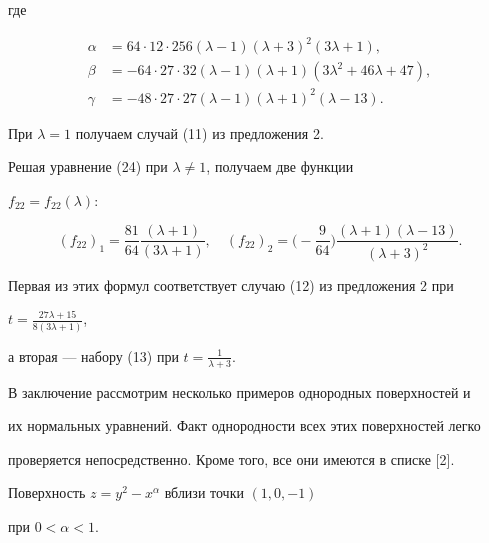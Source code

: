 где


\begin{align*}


\alpha&= 64 \cdot 12 \cdot 256 (\lambda - 1) (\lambda+3) ^2


(3 \lambda+1), \\


\beta&=-64 \cdot 27 \cdot 32 (\lambda - 1) (\lambda+1)


(3 \lambda^2+46 \lambda+47), \\


\gamma&=-48 \cdot 27 \cdot 27 (\lambda - 1) (\lambda+1)^2


(\lambda - 13).


\end{align*}





При $\lambda=1$ получаем случай (11) из предложения 2.





Решая уравнение (24) при $\lambda \ne 1$, получаем две функции


$f_{22}=f_{22} (\lambda)$:


$$


(f_{22})_1=\frac{81}{64} \frac{(\lambda+1)}{(3 \lambda+1)}, \quad


(f_{22})_2=\bigg(-\frac9{64}\bigg) \frac{(\lambda+1)(\lambda - 13)}


{(\lambda+3) ^2}.


$$


Первая из этих формул соответствует случаю (12) из предложения 2 при


$t=\frac{27 \lambda+15}{8 (3 \lambda+1)}$,


а вторая --- набору (13) при $t=\frac1{\lambda+3}$.





В заключение рассмотрим несколько примеров однородных поверхностей и


их нормальных уравнений. Факт однородности всех этих поверхностей легко


проверяется непосредственно. Кроме того, все они имеются в списке [2].





\begin{exam}


Поверхность $z=y^2 - x^\alpha$ вблизи точки $(1,0,-1)$


при $0 < \alpha < 1$.


\end{exam}





